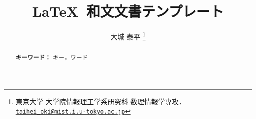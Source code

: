 \documentclass[11pt, a4paper, dvipdfmx, uplatex]{jsarticle}
\title{\LaTeX\ 和文文書テンプレート}
\author{大城 泰平%
  \texorpdfstring{\thanks{
    東京大学 大学院情報理工学系研究科 数理情報学専攻．
    \href{mailto:taihei_oki@mist.i.u-tokyo.ac.jp}{\nolinkurl{taihei_oki@mist.i.u-tokyo.ac.jp}}
  }}{Introduction}
}
\newcommand{\mykeywords}{キー，ワード}
\begin{document}
\maketitle

\begin{abstract}
  

  \bigskip\noindent\textbf{キーワード：} \mykeywords{}
\end{abstract}





\end{document}
